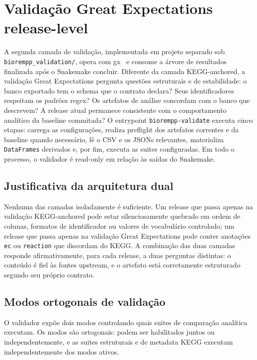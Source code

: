\section{Validação Great Expectations release-level}
\label{sec:c1-validacao-gx}

A segunda camada de validação, implementada em projeto separado sob \texttt{biorempp\_validation/}, opera com \gls{gx}~\citep{greatexpectations} e consome a árvore de resultados finalizada após o Snakemake concluir. Diferente da camada KEGG-anchored, a validação Great Expectations pergunta questões estruturais e de estabilidade: o banco exportado tem o schema que o contrato declara? Seus identificadores respeitam os padrões regex? Os artefatos de análise concordam com o banco que descrevem? A release atual permanece consistente com o comportamento analítico da baseline commitada? O entrypoint \texttt{biorempp-validate} executa cinco etapas: carrega as configurações, realiza preflight dos artefatos correntes e da baseline quando necessário, lê o CSV e os JSONs relevantes, materializa \texttt{DataFrames} derivados e, por fim, executa as suites configuradas. Em todo o processo, o validador é read-only em relação às saídas do Snakemake.

\subsection{Justificativa da arquitetura dual}

Nenhuma das camadas isoladamente é suficiente. Um release que passa apenas na validação KEGG-anchored pode estar silenciosamente quebrado em ordem de colunas, formatos de identificador ou valores de vocabulário controlado; um release que passa apenas na validação Great Expectations pode conter anotações \texttt{ec} ou \texttt{reaction} que discordam do KEGG. A combinação das duas camadas responde afirmativamente, para cada release, a duas perguntas distintas: o conteúdo é fiel às fontes upstream, e o artefato está corretamente estruturado segundo seu próprio contrato.

\subsection{Modos ortogonais de validação}

O validador expõe dois modos controlando quais suites de comparação analítica executam. Os modos são ortogonais: podem ser habilitados juntos ou independentemente, e as suites estruturais e de metadata KEGG executam independentemente dos modos ativos.

